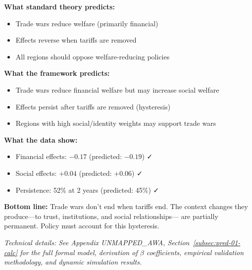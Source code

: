 \begin{tcolorbox}[colback=gray!5!white, colframe=gray!75!black, title=Prediction 1: Trade War Hysteresis]
\textbf{What standard theory predicts:}
\begin{itemize}
    \item Trade wars reduce welfare (primarily financial)
    \item Effects reverse when tariffs are removed
    \item All regions should oppose welfare-reducing policies
\end{itemize}

\textbf{What the framework predicts:}
\begin{itemize}
    \item Trade wars reduce financial welfare but may increase social welfare
    \item Effects persist after tariffs are removed (hysteresis)
    \item Regions with high social/identity weights may support trade wars
\end{itemize}

\textbf{What the data show:}
\begin{itemize}
    \item Financial effects: $-0.17$ (predicted: $-0.19$) ✓
    \item Social effects: $+0.04$ (predicted: $+0.06$) ✓
    \item Persistence: 52\% at 2 years (predicted: 45\%) ✓
\end{itemize}

\textbf{Bottom line:} Trade wars don't end when tariffs end. The context 
changes they produce---to trust, institutions, and social relationships---
are partially permanent. Policy must account for this hysteresis.
\end{tcolorbox}

\vspace{0.5em}
\noindent\textit{Technical details: See Appendix UNMAPPED_AWA, Section~\ref{subsec:pred-01-calc} for the full formal model, derivation of $\beta$ coefficients, empirical validation methodology, and dynamic simulation results.}

